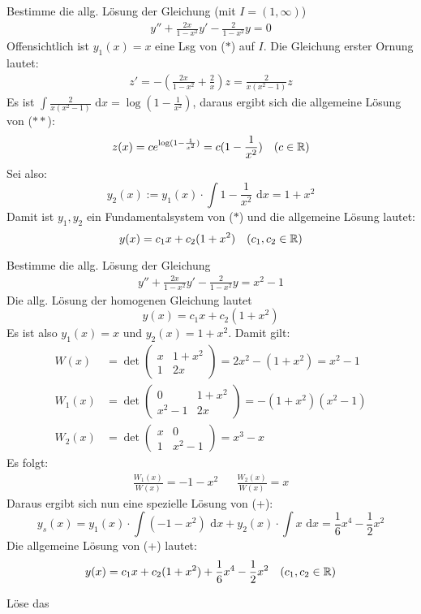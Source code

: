 \documentclass[a4paper,oneside,DIV15,BCOR12mm,chapterprefix=true,headings=onelinechapter]{scrbook}
\begin{document}
\begin{beispiele}
\item Bestimme die allg. Lösung der Gleichung (mit $I=(1,\infty)$)
\begin{align*}
\tag{$*$} y''+\frac{2x}{1-x^2}y'-\frac{2}{1-x^2}y=0
\end{align*}
Offensichtlich ist $y_1(x)=x$ eine Lsg von ($*$) auf $I$. Die Gleichung erster Ornung lautet:
\begin{align*}
\tag{$**$} z'=-\left(\frac{2x}{1-x^2}+\frac 2x\right)z=\frac 2{x(x^2-1)} z
\end{align*}
Es ist $\int\frac2{x(x^2-1)}\text{ d}x=\log(1-\frac1{x^2})$, daraus ergibt sich die allgemeine
Lösung von ($**$):
\[z(x)=ce^{\log(1-\frac1{x^2})}=c(1-\frac1{x^2})\quad (c\in\mathbb{R})\]
Sei also:
\[y_2(x):=y_1(x)\cdot\int 1-\frac1{x^2}\text{ d}x=1+x^2\]
Damit ist $y_1,y_2$ ein Fundamentalsystem von ($*$) und die allgemeine Lösung lautet:
\[y(x)=c_1x+c_2(1+x^2)\quad (c_1,c_2\in\mathbb{R})\]
\item Bestimme die allg. Lösung der Gleichung
\begin{align*}
\tag{+} y''+\frac{2x}{1-x^2}y'-\frac{2}{1-x^2}y=x^2-1
\end{align*}
Die allg. Lösung der homogenen Gleichung lautet
\[y(x)=c_1x+c_2(1+x^2)\]
Es ist also $y_1(x)=x$ und $y_2(x)=1+x^2$. Damit gilt:
\begin{align*}
W(x)&=\det\begin{pmatrix}
x&1+x^2\\
1&2x
\end{pmatrix}=2x^2-(1+x^2)=x^2-1\\
W_1(x)&=\det\begin{pmatrix}
0&1+x^2\\
x^2-1&2x
\end{pmatrix}=-(1+x^2)(x^2-1)\\
W_2(x)&=\det\begin{pmatrix}
x&0\\
1&x^2-1	
\end{pmatrix}=x^3-x
\end{align*}
Es folgt:
\begin{align*}
\frac{W_1(x)}{W(x)}=-1-x^2 &&\frac{W_2(x)}{W(x)}=x  
\end{align*}
Daraus ergibt sich nun eine spezielle Lösung von (+):
\[y_s(x)=y_1(x)\cdot\int(-1-x^2)\text{ d}x+y_2(x)\cdot\int x\text{ d}x=\frac16 x^4-\frac12 x^2\]
Die allgemeine Lösung von (+) lautet:
\[y(x)=c_1x+c_2(1+x^2)+\frac16 x^4-\frac12 x^2\quad (c_1,c_2\in\mathbb{R})\]
\item Löse das

\end{beispiele}
\end{document}
